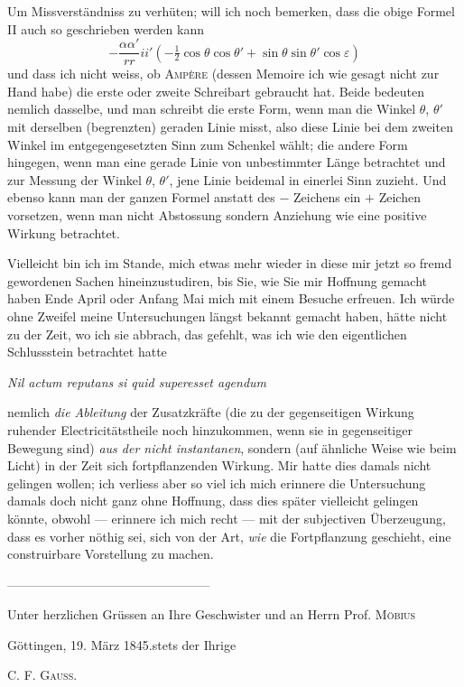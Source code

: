 Um Missverständniss zu verhüten; will ich noch bemerken, dass die obige Formel II auch so geschrieben werden kann
\[
-\frac{\alpha\alpha'}{rr}ii'\left(-\tfrac12\cos\theta\cos\theta'+\sin\theta\sin\theta'\cos\varepsilon\right)
\]
und dass ich nicht weiss, ob \textsc{Ampère} (dessen Memoire ich wie gesagt nicht zur Hand habe) die erste oder zweite Schreibart gebraucht hat. Beide bedeuten nemlich dasselbe, und man schreibt die erste Form, wenn man die Winkel $\theta$, $\theta'$ mit derselben (begrenzten) geraden Linie misst, also diese Linie bei dem zweiten Winkel im entgegengesetzten Sinn zum Schenkel wählt; die andere Form hingegen, wenn man eine gerade Linie von unbestimmter Länge betrachtet und zur Messung der Winkel $\theta$, $\theta'$, jene Linie beidemal in einerlei Sinn zuzieht. Und ebenso kann man der ganzen Formel anstatt des $-$ Zeichens ein $+$ Zeichen vorsetzen, wenn man nicht Abstossung sondern Anziehung wie eine positive Wirkung betrachtet.

Vielleicht bin ich im Stande, mich etwas mehr wieder in diese mir jetzt so fremd gewordenen Sachen hineinzustudiren, bis Sie, wie Sie mir Hoffnung gemacht haben Ende April oder Anfang Mai mich mit einem Besuche erfreuen. Ich würde ohne Zweifel meine Untersuchungen längst bekannt gemacht haben, hätte nicht zu der Zeit, wo ich sie abbrach, das gefehlt, was ich wie den eigentlichen Schlussstein betrachtet hatte
\begin{center}\textit{Nil actum reputans si quid superesset agendum}\end{center}
nemlich \textit{die Ableitung} der Zusatzkräfte (die zu der gegenseitigen Wirkung ruhender Electricitätstheile noch hinzukommen, wenn sie in gegenseitiger Bewegung sind) \textit{aus der nicht instantanen}, sondern (auf ähnliche Weise wie beim Licht) in der Zeit sich fortpflanzenden Wirkung. Mir hatte dies damals nicht gelingen wollen; ich verliess aber so viel ich mich erinnere die Untersuchung damals doch nicht ganz ohne Hoffnung, dass dies später vielleicht gelingen könnte, obwohl — erinnere ich mich recht — mit der subjectiven Überzeugung, dass es vorher nöthig sei, sich von der Art, \textit{wie} die Fortpflanzung geschieht, eine construirbare Vorstellung zu machen.
\begin{center}—\quad —\quad —\quad —\quad —\quad —\quad —\quad —\quad —\quad —\quad —\quad —\quad —\quad —\quad —\quad —\end{center}
\noindent\begin{minipage}{\linewidth}
Unter herzlichen Grüssen an Ihre Geschwister und an Herrn Prof. \textsc{Möbius}

Göttingen, 19. März 1845.\hfill stets der Ihrige
\begin{flushright}C. F. \textsc{Gauss}.\end{flushright}
\end{minipage}

